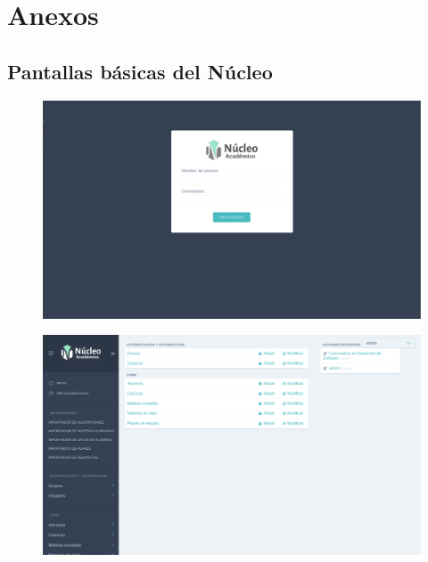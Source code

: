 \chapter{Anexos}

\section{Pantallas básicas del Núcleo}


\begin{figure}[!htbp]
  \centering
    \includegraphics[scale=0.3]{images/nucleo/nucleo-login.png}
  \label{fig:nucleo-login}
\end{figure}

\begin{figure}[!htbp]
  \centering
    \includegraphics[scale=0.3]{images/nucleo/nucleo-home.png}
  \label{fig:nucleo-home}
\end{figure}

